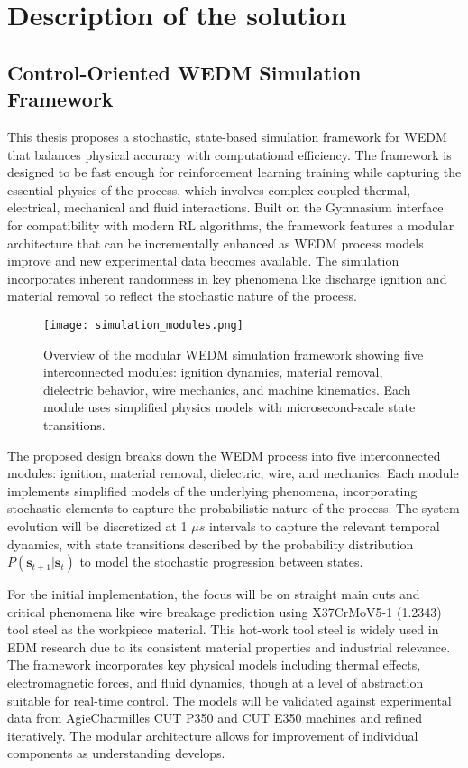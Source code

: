 \documentclass[11pt]{article}
\begin{document}
\section{Description of the solution}

\subsection{Control-Oriented WEDM Simulation Framework}

This thesis proposes a stochastic, state-based simulation framework for WEDM that balances physical accuracy with computational efficiency. The framework is designed to be fast enough for reinforcement learning training while capturing the essential physics of the process, which involves complex coupled thermal, electrical, mechanical and fluid interactions. Built on the Gymnasium interface for compatibility with modern RL algorithms, the framework features a modular architecture that can be incrementally enhanced as WEDM process models improve and new experimental data becomes available. The simulation incorporates inherent randomness in key phenomena like discharge ignition and material removal to reflect the stochastic nature of the process.


\begin{figure}[htbp]
    \centering
    \texttt{[image: simulation\_modules.png]}
    \caption{Overview of the modular WEDM simulation framework showing five interconnected modules: ignition dynamics, material removal, dielectric behavior, wire mechanics, and machine kinematics. Each module uses simplified physics models with microsecond-scale state transitions.}
    \label{fig:simulation_modules}
\end{figure}

The proposed design breaks down the WEDM process into five interconnected modules: ignition, material removal, dielectric, wire, and mechanics. Each module implements simplified models of the underlying phenomena, incorporating stochastic elements to capture the probabilistic nature of the process. The system evolution will be discretized at 1 $\mu s$ intervals to capture the relevant temporal dynamics, with state transitions described by the probability distribution $P(\mathbf{s}_{t+1}|\mathbf{s}_t)$ to model the stochastic progression between states.

For the initial implementation, the focus will be on straight main cuts and critical phenomena like wire breakage prediction using X37CrMoV5-1 (1.2343) tool steel as the workpiece material. This hot-work tool steel is widely used in EDM research due to its consistent material properties and industrial relevance. The framework incorporates key physical models including thermal effects, electromagnetic forces, and fluid dynamics, though at a level of abstraction suitable for real-time control. The models will be validated against experimental data from AgieCharmilles CUT P350 and CUT E350 machines and refined iteratively. The modular architecture allows for improvement of individual components as understanding develops.
\end{document}
